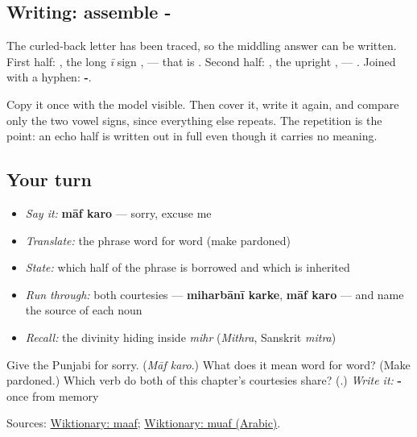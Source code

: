\subsection*{Writing: assemble -}
The curled-back letter has been traced, so the middling answer can be written. First half: \textbf{}, the long \emph{ī} sign \textbf{}, \textbf{} — that is \textbf{}. Second half: \textbf{}, the upright \textbf{}, \textbf{} — \textbf{}. Joined with a hyphen: \textbf{-}.

Copy it once with the model visible. Then cover it, write it again, and compare only the two vowel signs, since everything else repeats. The repetition is the point: an echo half is written out in full even though it carries no meaning.

\subsection*{Your turn}
\begin{itemize}
\raggedright
  \item \emph{Say it:} \textbf{māf karo} — sorry, excuse me
  \item \emph{Translate:} the phrase word for word (make pardoned)
  \item \emph{State:} which half of the phrase is borrowed and which is inherited
  \item \emph{Run through:} both courtesies — \textbf{miharbānī karke}, \textbf{māf karo} — and name the source of each noun
  \item \emph{Recall:} the divinity hiding inside \emph{mihr} (\emph{Mithra}, Sanskrit \emph{mitra})
\end{itemize}

\begin{tcolorbox}[breakable,colback=teal!4,colframe=teal!35!black,title={Before you move on}]
Give the Punjabi for sorry. (\emph{Māf karo}.) What does it mean word for word? (Make pardoned.) Which verb do both of this chapter's courtesies share? (\textbf{}.) \emph{Write it:} \textbf{-} once from memory

Sources: \href{https://en.wiktionary.org/wiki/\%E0\%A8\%AE\%E0\%A8\%BE\%E0\%A8\%AB\%E0\%A8\%BC}{Wiktionary: maaf}; \href{https://en.wiktionary.org/wiki/\%D9\%85\%D8\%B9\%D8\%A7\%D9\%81}{Wiktionary: muaf (Arabic)}.
\end{tcolorbox}

